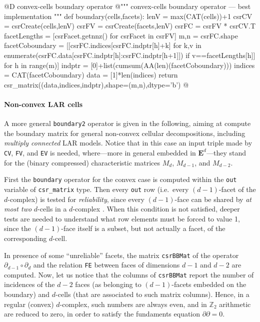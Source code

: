 \documentclass[11pt,oneside]{article}	%
\def\Z{\mathbb{Z}}
\begin{document}
@D convex-cells boundary operator
@{""" convex-cells boundary operator --- best implementation """
def boundary(cells,facets):
    lenV = max(CAT(cells))+1
    csrCV = csrCreate(cells,lenV)
    csrFV = csrCreate(facets,lenV)
    csrFC = csrFV * csrCV.T
    facetLengths = [csrFacet.getnnz() for csrFacet in csrFV]
    m,n = csrFC.shape
    facetCoboundary = [[csrFC.indices[csrFC.indptr[h]+k] 
        for k,v in enumerate(csrFC.data[csrFC.indptr[h]:csrFC.indptr[h+1]]) 
            if v==facetLengths[h]] for h in range(m)]
    indptr = [0]+list(cumsum(AA(len)(facetCoboundary)))
    indices = CAT(facetCoboundary)
    data = [1]*len(indices)
    return csr_matrix((data,indices,indptr),shape=(m,n),dtype='b')
@}


\paragraph{Non-convex LAR cells}

A more general \texttt{boundary2} operator is given in the following, aiming at compute the boundary matrix for general non-convex cellular decompositions, including \emph{multiply connected} LAR models.
Notice that in this case an input triple made by \texttt{CV}, \texttt{FV}, and \texttt{EV} is needed,
where---more in general embedded in $\mathbf{E}^d$---they stand for the (binary compressed) characteristic matrices $M_d$, $M_{d-1}$, and $M_{d-2}$.

First the \texttt{boundary} operator for the convex case is computed within the \texttt{out} variable of \texttt{csr\_matrix} type. Then every \texttt{out} row (i.e.~every $(d-1)$-facet of the $d$-complex) is tested for \emph{reliability}, since every $(d-1)$-face can be shared by \emph{at most two} $d$-cells in a $d$-complex . When this condition is not satisfied, deeper tests are needed to understand what row elements must be forced to value 1, since the $(d-1)$-face itself is a subset, but not actually a facet, of the corresponding $d$-cell. 

In presence of some ``unreliable'' facets, the matrix \texttt{csrBBMat} of the operator $\partial_{d-1}\circ\partial_d$ and the relation \texttt{FE} between faces of dimensions $d-1$ and $d-2$ are computed. Now, let us notice that the columns of \texttt{csrBBMat} report the number of incidences of the $d-2$ faces (as belonging to $(d-1)$-facets embedded on the boundary) and $d$-cells (that are associated to such matrix columns). Hence, in a regular (convex) $d$-complex, such numbers are always even, and in $\Z_2$ arithmetic are reduced to zero, in order to satisfy the fundaments equation $\partial\partial=0$. 
\end{document}
